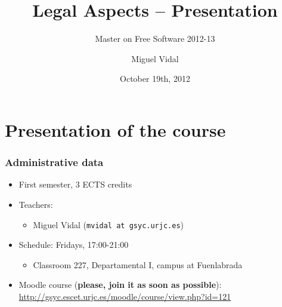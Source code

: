 \documentclass{beamer}
\begin{document}
\title{Legal Aspects -- Presentation}
\subtitle{Master on Free Software 2012-13}
\author{Miguel Vidal} 
\date{October 19th, 2012}




\section{Presentation of the course}


\begin{frame}
\frametitle{Administrative data}

\begin{itemize}
\item First semester, 3 ECTS credits
\item Teachers:
  \begin{itemize}
  \item \alert{Miguel Vidal} (\texttt{mvidal at gsyc.urjc.es})
  \end{itemize}
\item Schedule: \alert{Fridays, 17:00-21:00}
  \begin{itemize}
  \item Classroom 227, Departamental I, campus at Fuenlabrada
  \end{itemize}
\item Moodle course (\textbf{please, join it as soon as possible}): \\
  {\footnotesize\url{http://gsyc.escet.urjc.es/moodle/course/view.php?id=121}}
\end{itemize}
\end{frame}
\end{document}
